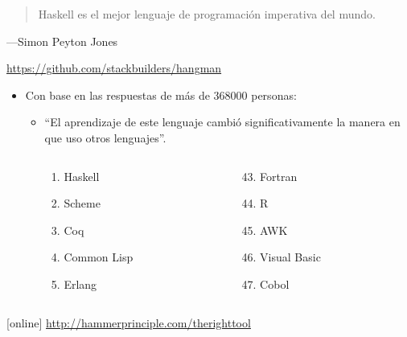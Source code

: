 \documentclass[spanish]{beamer}
\begin{document}

\begin{frame}
  \begin{quote}
    Haskell es el mejor lenguaje de programación imperativa del mundo.
  \end{quote}
  \hfill---Simon Peyton Jones
\end{frame}


\begin{frame}
  \begin{center}
    \url{https://github.com/stackbuilders/hangman}
  \end{center}
\end{frame}


\begin{frame}
  \begin{itemize}
  \item
    Con base en las respuestas de más de 368000 personas:
    \begin{itemize}
    \item
      ``El aprendizaje de este lenguaje cambió significativamente la
      manera en que uso otros lenguajes''.
      \begin{columns}[T]
        \begin{column}{3cm}
          \begin{enumerate}
          \item Haskell
          \item Scheme
          \item Coq
          \item Common Lisp
          \item Erlang
          \end{enumerate}
        \end{column}
        \begin{column}{3cm}
          \begin{enumerate}
          \setcounter{enumi}{42}
          \item Fortran
          \item R
          \item AWK
          \item Visual Basic
          \item Cobol
          \end{enumerate}
        \end{column}
      \end{columns}
    \end{itemize}
  \end{itemize}
  \begin{thebibliography}{}
  [online]
    \newblock \url{http://hammerprinciple.com/therighttool}
  \end{thebibliography}
\end{frame}
\end{document}
